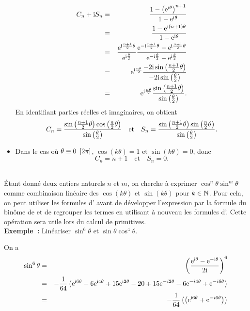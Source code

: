 \documentclass{magnolia}
\begin{document}
\begin{applications}
\begin{sol}
\begin{itemize}
\begin{eqnarray*}
    C_n+{\rm i} S_n &=& \frac{1-\left({\rm e}^{{\rm i}\theta}\right)^{n+1}}{1-{\rm e}^{{\rm i}\theta}}\\
             &=& \frac{1-{\rm e}^{{\rm i} \left(n+1\right)\theta}}{1-{\rm e}^{{\rm i}\theta}}\\
             &=& \frac{{\rm e}^{{\rm i}\frac{n+1}{2}\theta}}{{\rm e}^{{\rm i}\frac{\theta}{2}}}
                 \frac{{\rm e}^{-{\rm i}\frac{n+1}{2}\theta}-{\rm e}^{{\rm i}\frac{n+1}{2}\theta}}
                      {{\rm e}^{-{\rm i}\frac{\theta}{2}}-{\rm e}^{{\rm i}\frac{\theta}{2}}}\\
             &=& {\rm e}^{{\rm i}\frac{n\theta}{2}}\frac{-2{\rm i}\sin\left(\frac{n+1}{2}\theta\right)}
                 {-2{\rm i}\sin\left(\frac{\theta}{2}\right)}\\
             &=& {\rm e}^{{\rm i}\frac{n\theta}{2}}\frac{\sin\left(\frac{n+1}{2}\theta\right)}
                 {\sin\left(\frac{\theta}{2}\right)}.
    \end{eqnarray*}
    En identifiant parties réelles et imaginaires, on obtient
    $$C_n=\frac{\sin\left(\frac{n+1}{2}\theta\right)\cos\left(\frac{n}{2}\theta\right)}
          {\sin\left(\frac{\theta}{2}\right)} \quad \text{et} \quad
      S_n=\frac{\sin\left(\frac{n+1}{2}\theta\right)\sin\left(\frac{n}{2}\theta\right)}
          {\sin\left(\frac{\theta}{2}\right)}.$$
  \item Dans le cas où $\theta\equiv 0\ \cro{2\pi}$, $\cos (k\theta)=1$ et
    $\sin(k\theta)=0$, donc
    $$C_n=n+1 \quad \text{et} \quad S_n=0.$$
  \end{itemize}      
  \end{sol}
\\
  Étant donné deux entiers naturels $n$ et $m$, on cherche à exprimer
  $\cos^n \theta \sin^m \theta$ comme combinaison linéaire des $\cos(k\theta)$
  et $\sin(k\theta)$ pour $k\in\mathbb{N}$. Pour cela, on peut utiliser les formules
  d' avant de développer l'expression par la formule
  du binôme de  et de regrouper les termes en utilisant à nouveau
  les formules d'. Cette opération sera utile lors
  du calcul de primitives.\\
  {\bf Exemple~:} Linéariser $\sin^6 \theta$ et $\sin\theta \cos^4 \theta$.
    \begin{sol}
    On a
    \begin{eqnarray*}
    \sin^6 \theta &=& \left(\frac{{\rm e}^{{\rm i}\theta}-{\rm e}^{-{\rm i}\theta}}{2{\rm i}}\right)^6\\
    &=& -\frac{1}{64}\left({\rm e}^{{\rm i} 6\theta}-6{\rm e}^{{\rm i} 4\theta}+15{\rm e}^{{\rm i} 2\theta}-20
                        +15{\rm e}^{-i2\theta}-6{\rm e}^{-i4\theta}+{\rm e}^{-i6\theta}\right)\\
    &=& -\frac{1}{64}\left(\left({\rm e}^{{\rm i} 6\theta}+{\rm e}^{-i6\theta}\right)
\right)
\end{eqnarray*}
\end{sol}
\end{applications}
\end{document}
